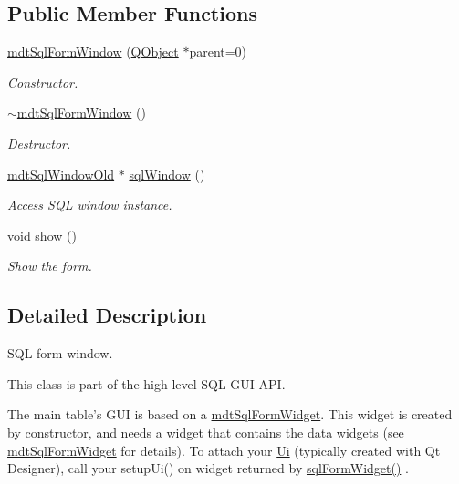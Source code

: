 \subsection*{Public Member Functions}
\begin{DoxyCompactItemize}
\item 
\hyperlink{classmdt_sql_form_window_a67149a8239b5918ef269d5ff0473813e}{mdt\-Sql\-Form\-Window} (\hyperlink{class_q_object}{Q\-Object} $\ast$parent=0)
\begin{DoxyCompactList}\small\item\em Constructor. \end{DoxyCompactList}\item 
\hyperlink{classmdt_sql_form_window_a3399ae1660eeca90ccbf2132858d78c6}{$\sim$mdt\-Sql\-Form\-Window} ()
\begin{DoxyCompactList}\small\item\em Destructor. \end{DoxyCompactList}\item 
\hyperlink{classmdt_sql_window_old}{mdt\-Sql\-Window\-Old} $\ast$ \hyperlink{classmdt_sql_form_window_aa6960d4e87ff0ec12536a859ff72d9b4}{sql\-Window} ()
\begin{DoxyCompactList}\small\item\em Access S\-Q\-L window instance. \end{DoxyCompactList}\item 
void \hyperlink{classmdt_sql_form_window_a659782b4223406d694f0bcd702f7c017}{show} ()
\begin{DoxyCompactList}\small\item\em Show the form. \end{DoxyCompactList}\end{DoxyCompactItemize}


\subsection{Detailed Description}
S\-Q\-L form window. 

This class is part of the high level S\-Q\-L G\-U\-I A\-P\-I.

The main table's G\-U\-I is based on a \hyperlink{classmdt_sql_form_widget}{mdt\-Sql\-Form\-Widget}. This widget is created by constructor, and needs a widget that contains the data widgets (see \hyperlink{classmdt_sql_form_widget}{mdt\-Sql\-Form\-Widget} for details). To attach your \hyperlink{namespace_ui}{Ui} (typically created with Qt Designer), call your setup\-Ui() on widget returned by \hyperlink{classmdt_sql_form_old_ae0e5815ceaced65e8465adc2fe887c51}{sql\-Form\-Widget()} .

